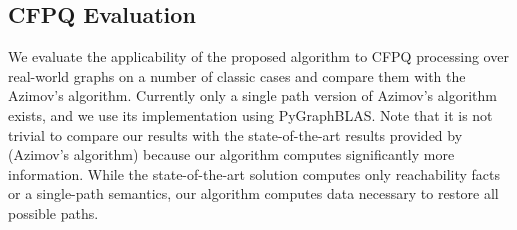 

\subsection{CFPQ Evaluation}

We evaluate the applicability of the proposed algorithm to CFPQ processing over real-world graphs on a number of classic cases and compare them with the Azimov's algorithm.
Currently only a single path version of Azimov's algorithm exists, and we use its implementation using PyGraphBLAS. Note that it is not trivial to compare our results with the state-of-the-art results provided by~\cite{10.1145/3398682.3399163} (Azimov's algorithm) because our algorithm computes significantly more information. While the state-of-the-art solution computes only reachability facts or a single-path semantics, our algorithm computes data necessary to restore all possible paths.


